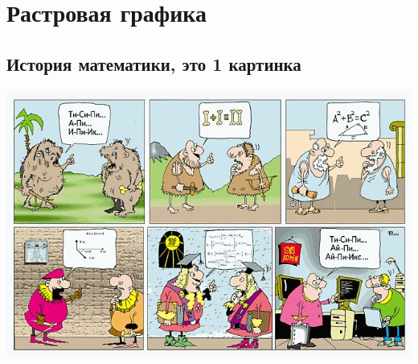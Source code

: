 \section[Рисунки]{Растровая графика}
\subsection[Математика]{История математики, это 1 картинка}

\ifpdf
	\begin{center} 
		\includegraphics[width=15cm]{img/math.jpg}
	\end{center}
	
%		

